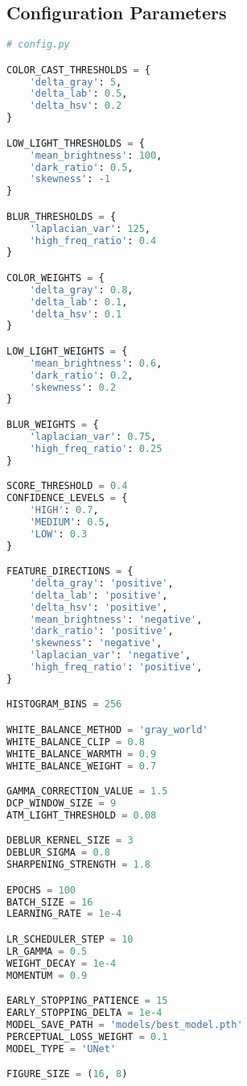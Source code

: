 \documentclass{apmcmthesis}
\begin{document}
\subsection{Configuration Parameters}
\begin{lstlisting}[language=python,caption={Configuration File}]
# config.py

COLOR_CAST_THRESHOLDS = {
    'delta_gray': 5,
    'delta_lab': 0.5,
    'delta_hsv': 0.2
}

LOW_LIGHT_THRESHOLDS = {
    'mean_brightness': 100,
    'dark_ratio': 0.5,
    'skewness': -1
}

BLUR_THRESHOLDS = {
    'laplacian_var': 125,
    'high_freq_ratio': 0.4
}

COLOR_WEIGHTS = {
    'delta_gray': 0.8,
    'delta_lab': 0.1,
    'delta_hsv': 0.1
}

LOW_LIGHT_WEIGHTS = {
    'mean_brightness': 0.6,
    'dark_ratio': 0.2,
    'skewness': 0.2
}

BLUR_WEIGHTS = {
    'laplacian_var': 0.75,
    'high_freq_ratio': 0.25
}

SCORE_THRESHOLD = 0.4       
CONFIDENCE_LEVELS = {
    'HIGH': 0.7,   
    'MEDIUM': 0.5, 
    'LOW': 0.3     
}

FEATURE_DIRECTIONS = {
    'delta_gray': 'positive',
    'delta_lab': 'positive',
    'delta_hsv': 'positive',
    'mean_brightness': 'negative',  
    'dark_ratio': 'positive',       
    'skewness': 'negative',         
    'laplacian_var': 'negative',    
    'high_freq_ratio': 'positive',  
}

HISTOGRAM_BINS = 256

WHITE_BALANCE_METHOD = 'gray_world'  
WHITE_BALANCE_CLIP = 0.8 
WHITE_BALANCE_WARMTH = 0.9  
WHITE_BALANCE_WEIGHT = 0.7  

GAMMA_CORRECTION_VALUE = 1.5  
DCP_WINDOW_SIZE = 9
ATM_LIGHT_THRESHOLD = 0.08 

DEBLUR_KERNEL_SIZE = 3
DEBLUR_SIGMA = 0.8 
SHARPENING_STRENGTH = 1.8

EPOCHS = 100           
BATCH_SIZE = 16        
LEARNING_RATE = 1e-4   

LR_SCHEDULER_STEP = 10
LR_GAMMA = 0.5
WEIGHT_DECAY = 1e-4 
MOMENTUM = 0.9 

EARLY_STOPPING_PATIENCE = 15
EARLY_STOPPING_DELTA = 1e-4
MODEL_SAVE_PATH = 'models/best_model.pth' 
PERCEPTUAL_LOSS_WEIGHT = 0.1
MODEL_TYPE = 'UNet'

FIGURE_SIZE = (16, 8)

\end{lstlisting}
\end{document}
